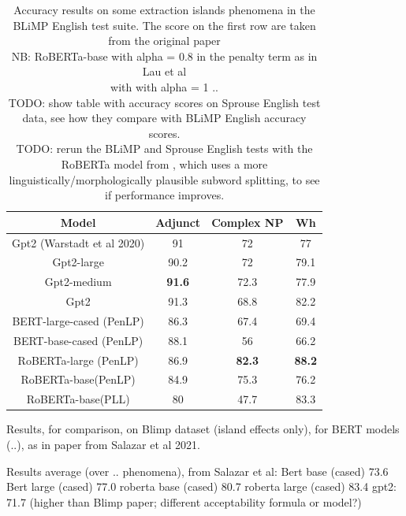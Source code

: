 \begin{table} 
	\begin{center}
		\begin{tabular}{c|c|c|c} 
			Model & \textbf{Adjunct} & \textbf{Complex NP} & \textbf{Wh} \\
			\hline
			Gpt2 (Warstadt et al 2020) 	& 91 			& 72 			& 77 \\ 
			Gpt2-large 					& 90.2 			& 72 			& 79.1 \\ 
	  		Gpt2-medium 				& \textbf{91.6} & 72.3			& 77.9 \\
	  		Gpt2 						& 91.3 			& 68.8 			& 82.2 \\
	  		BERT-large-cased (PenLP)	& 86.3			& 67.4 			& 69.4 \\
	  		BERT-base-cased (PenLP)		& 88.1 			& 56 			& 66.2 \\
	  		RoBERTa-large (PenLP)		& 86.9			& \textbf{82.3}	& \textbf{88.2} \\
	  		RoBERTa-base(PenLP)			& 84.9			& 75.3 			& 76.2 \\  
	  		RoBERTa-base(PLL)			& 80			& 47.7 			& 83.3 \\  
	  		 
		\end{tabular}
		\caption{Accuracy results on some extraction islands phenomena in the BLiMP English test suite. The score on the first row are taken from the original paper \citet{warstadt2020blimp} 
			\\ NB: RoBERTa-base with alpha = 0.8 in the penalty term  as in Lau et al
			\\ with with alpha = 1 ..
			\\ TODO: show table with accuracy scores on Sprouse English test data, see how they compare with BLiMP English accuracy scores.
			\\ TODO: rerun the BLiMP and Sprouse English tests with the RoBERTa model from \citet{bostrom2020byte}, which uses a more linguistically/morphologically plausible subword splitting, to see if performance improves.}
		\label{tab:accuracy_blimp}
	\end{center}
\end{table}

Results, for comparison, on Blimp dataset (island effects only), for BERT models (..), as in paper from Salazar et al 2021.

Results average (over .. phenomena), from Salazar et al:
Bert base (cased) 73.6
Bert large (cased) 77.0
roberta base (cased) 80.7
roberta large (cased) 83.4
gpt2: 71.7 (higher than Blimp paper; different acceptability formula or model?)


